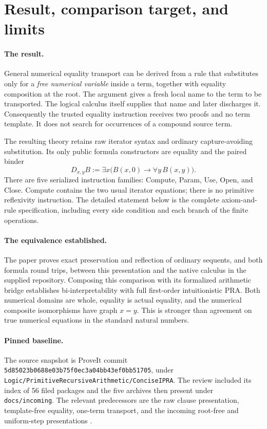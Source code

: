 \section{Result, comparison target, and limits}

\paragraph{The result.}
General numerical equality transport can be derived from a rule that
substitutes only for a \emph{free numerical variable} inside a term, together
with equality composition at the root. The argument gives a fresh local
name to the term to be transported. The logical calculus itself supplies
that name and later discharges it. Consequently the trusted equality
instruction receives two proofs and no term template. It does not search
for occurrences of a compound source term.

The resulting theory retains raw iterator syntax and ordinary
capture-avoiding substitution. Its only public formula constructors are
equality and the paired binder
\[
 D_{x,y}B := \exists x\bigl(B(x,0)\to\forall y\,B(x,y)\bigr).
\]
There are five serialized instruction families: Compute, Param, Use,
Open, and Close. Compute contains the two usual iterator equations;
there is no primitive reflexivity instruction. The detailed statement
below is the complete axiom-and-rule specification, including every
side condition and each branch of the finite operations.

\paragraph{The equivalence established.}
The paper proves exact preservation and reflection of ordinary sequents,
and both formula round trips, between this presentation and the native
calculus in the supplied repository. Composing this comparison with its
formalized arithmetic bridge establishes bi-interpretability with full
first-order intuitionistic PRA. Both numerical domains are whole, equality
is actual equality, and the numerical composite isomorphisms have graph
$x=y$. This is stronger than agreement on true numerical equations in
the standard natural numbers.

\paragraph{Pinned baseline.}
The source snapshot is ProveIt commit
\texttt{5d85023b0688e03b75f0ec3a04bb43ef0bb51705}, under
\texttt{Logic/PrimitiveRecursiveArithmetic/ConciseIPRA}.
The review included its index of 56 filed packages and the five archives
then present under \texttt{docs/incoming}. The relevant predecessors are
the raw clause presentation, template-free equality, one-term transport,
and the incoming root-free and uniform-step presentations
\cite{index,rawclausal,templatefree,incoming}.

